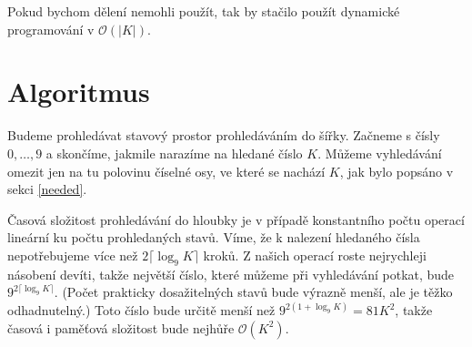 \documentclass{article}
\begin{document}
Pokud bychom dělení nemohli použít, tak by stačilo použít dynamické programování v $\mathcal{O}\left(\lvert K \rvert\right)$.

\section{Algoritmus}

Budeme prohledávat stavový prostor prohledáváním do šířky. Začneme s čísly $0, \dots, 9$ a skončíme, jakmile narazíme na hledané číslo $K$. Můžeme vyhledávání omezit jen na tu polovinu číselné osy, ve které se nachází $K$, jak bylo popsáno v sekci \ref{needed}.

Časová složitost prohledávání do hloubky je v případě konstantního počtu operací lineární ku počtu prohledaných stavů. Víme, že k nalezení hledaného čísla nepotřebujeme více než $2\lceil\log_9 K\rceil$ kroků. Z našich operací roste nejrychleji násobení devíti, takže největší číslo, které můžeme při vyhledávání potkat, bude $9^{2\lceil\log_9 K\rceil}$. (Počet prakticky dosažitelných stavů bude výrazně menší, ale je těžko odhadnutelný.) Toto číslo bude určitě menší než $9^{2 \left(1 + \log_9 K\right)} = 81 K^2$, takže časová i paměťová složitost bude nejhůře $\mathcal{O}\left(K^2\right)$.
\end{document}
